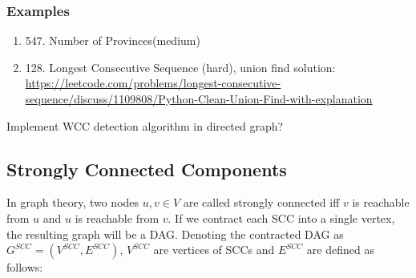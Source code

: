 \documentclass[../main.tex]{subfiles}
\begin{document}
\subsubsection{Examples}
\begin{enumerate}
\item 547. Number of Provinces(medium)
    \item 128. Longest Consecutive Sequence (hard), union find solution: \url{https://leetcode.com/problems/longest-consecutive-sequence/discuss/1109808/Python-Clean-Union-Find-with-explanation}
\end{enumerate}

  


\begin{bclogo}[couleur = blue!30, arrondi=0.1,logo=\bccrayon,ombre=true]{Implement WCC detection algorithm in directed graph? { }} 
\end{bclogo}

\subsection{Strongly Connected Components}
In graph theory, two nodes $u, v \in V$ are called strongly
connected iff $v$ is reachable from $u$ and
$u$ is reachable from $v$. If we contract each SCC into a single vertex, the resulting graph will be a DAG. Denoting the contracted DAG as $G^{SCC} = (V^{SCC}, E^{SCC})$, $V^{SCC}$ are vertices of SCCs and $E^{SCC}$ are defined as follows:
\end{document}
